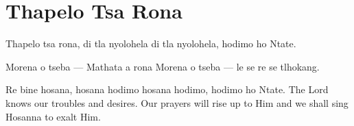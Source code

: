 \starttocol
\chapter{Thapelo Tsa Rona}
\nexttocol
\hfill{\it }
\stoptocol
\starttocol
\startlines
{\sc Thapelo} tsa rona, di tla nyolohela
di tla nyolohela, hodimo ho Ntate.

Morena o tseba --- Mathata a rona
Morena o tseba --- le se re se tlhokang.

Re bine hosana, hosana hodimo
hosana hodimo, hodimo ho Ntate.
\stoplines
\nexttocol
The Lord  knows our troubles and desires. 
Our prayers will rise up to Him and we shall sing Hosanna to exalt Him.
\stoptocol
